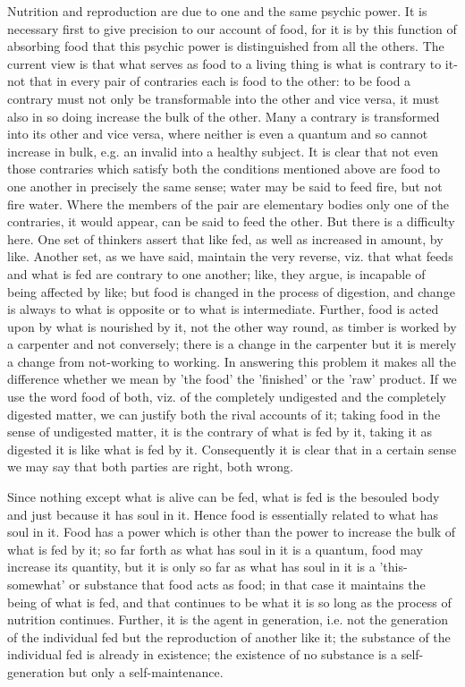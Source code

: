 Nutrition and reproduction are due to one and the same psychic power.
It is necessary first to give precision to our account of food, for
it is by this function of absorbing food that this psychic power is
distinguished from all the others. The current view is that what serves
as food to a living thing is what is contrary to it-not that in every
pair of contraries each is food to the other: to be food a contrary
must not only be transformable into the other and vice versa, it must
also in so doing increase the bulk of the other. Many a contrary is
transformed into its other and vice versa, where neither is even a
quantum and so cannot increase in bulk, e.g. an invalid into a healthy
subject. It is clear that not even those contraries which satisfy
both the conditions mentioned above are food to one another in precisely
the same sense; water may be said to feed fire, but not fire water.
Where the members of the pair are elementary bodies only one of the
contraries, it would appear, can be said to feed the other. But there
is a difficulty here. One set of thinkers assert that like fed, as
well as increased in amount, by like. Another set, as we have said,
maintain the very reverse, viz. that what feeds and what is fed are
contrary to one another; like, they argue, is incapable of being affected
by like; but food is changed in the process of digestion, and change
is always to what is opposite or to what is intermediate. Further,
food is acted upon by what is nourished by it, not the other way round,
as timber is worked by a carpenter and not conversely; there is a
change in the carpenter but it is merely a change from not-working
to working. In answering this problem it makes all the difference
whether we mean by 'the food' the 'finished' or the 'raw' product.
If we use the word food of both, viz. of the completely undigested
and the completely digested matter, we can justify both the rival
accounts of it; taking food in the sense of undigested matter, it
is the contrary of what is fed by it, taking it as digested it is
like what is fed by it. Consequently it is clear that in a certain
sense we may say that both parties are right, both wrong.

Since nothing except what is alive can be fed, what is fed is the
besouled body and just because it has soul in it. Hence food is essentially
related to what has soul in it. Food has a power which is other than
the power to increase the bulk of what is fed by it; so far forth
as what has soul in it is a quantum, food may increase its quantity,
but it is only so far as what has soul in it is a 'this-somewhat'
or substance that food acts as food; in that case it maintains the
being of what is fed, and that continues to be what it is so long
as the process of nutrition continues. Further, it is the agent in
generation, i.e. not the generation of the individual fed but the
reproduction of another like it; the substance of the individual fed
is already in existence; the existence of no substance is a self-generation
but only a self-maintenance. 

